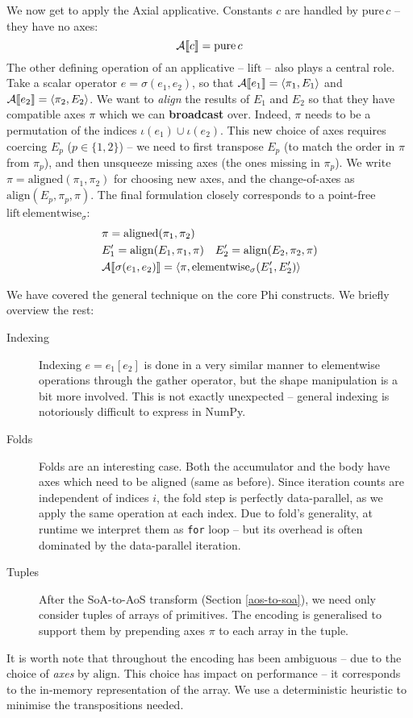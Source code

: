 We now get to apply the Axial applicative. Constants $c$ are handled by $\mathrm{pure}\,c$ -- they have no axes:
$$ \mathcal A \denot{c} = \mathrm{pure}\,c $$
The other defining operation of an applicative -- $\mathrm{lift}$ -- also plays a central role. 
Take a scalar operator $e = \sigma(e_1, e_2)$, so that $\mathcal A \denot{e_1} = \phipair{\pi_{1}}{E_1}$ and $\mathcal A \denot{e_2} = \phipair{\pi_{2}}{E_2}$. 
We want to \textit{align} the results of $E_1$ and $E_2$ so that they have compatible axes $\pi$ which we can \textbf{broadcast} over. 
Indeed, $\pi$ needs to be a permutation of the indices $\iota(e_1) \cup \iota(e_2)$. 
This new choice of axes requires coercing $E_p$ ($p \in \{1, 2\}$) -- we need to first transpose $E_p$ (to match the order in $\pi$ from $\pi_{p}$), and then unsqueeze missing axes (the ones missing in $\pi_{p}$). 
We write $\pi = \mathrm{aligned}(\pi_{1}, \pi_{2})$ for choosing new axes, and the change-of-axes as $\mathrm{align}(E_p, \pi_{p}, \pi)$. The final formulation closely corresponds to a point-free $\mathrm{lift}\,\mathrm{elementwise}_\sigma$:
\begin{align*}
\begin{split}
&\pi = \mathrm{aligned}(\pi_{1}, \pi_{2}) \\
&E_1' = \mathrm{align}(E_1, \pi_{1}, \pi) \quad E_2' = \mathrm{align}(E_2, \pi_{2}, \pi) \\
&\mathcal A \denot{\sigma(e_1, e_2)} = \left\langle \pi, \mathrm{elementwise}_{\sigma}(E_1', E_2') \right\rangle 
\end{split}
\end{align*}

We have covered the general technique on the core Phi constructs. We briefly overview the rest:
\begin{description}
    \item[Indexing] Indexing $e = e_1[e_2]$ is done in a very similar manner to elementwise operations through the $\mathrm{gather}$ operator, but the shape manipulation is a bit more involved. This is not exactly unexpected -- general indexing is notoriously difficult to express in NumPy.
    \item[Folds] Folds are an interesting case. Both the accumulator and the body have axes which need to be aligned (same as before). Since iteration counts are independent of indices $i$, the fold step is perfectly data-parallel, as we apply the same operation at each index. Due to fold's generality, at runtime we interpret them as \texttt{for} loop -- but its overhead is often dominated by the data-parallel iteration.
    \item[Tuples] After the SoA-to-AoS transform (Section \ref{aos-to-soa}), we need only consider tuples of arrays of primitives. The encoding is generalised to support them by prepending axes $\pi$ to each array in the tuple.  
\end{description}
It is worth note that throughout the encoding has been ambiguous -- due to the choice of \textit{axes} by $\mathrm{align}$. This choice has impact on performance -- it corresponds to the in-memory representation of the array. We use a deterministic heuristic to minimise the transpositions needed. 

